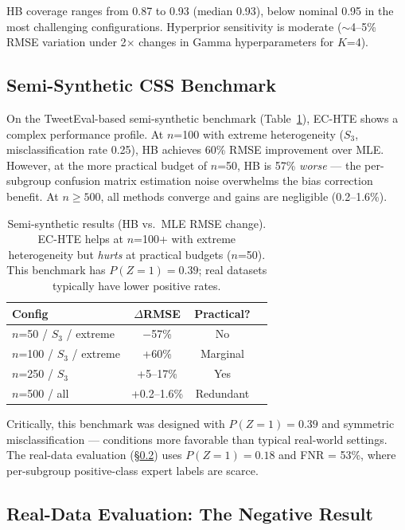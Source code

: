 \documentclass[11pt]{article}
\begin{document}
HB coverage ranges from 0.87 to 0.93 (median 0.93), below nominal 0.95 in the most challenging configurations.
Hyperprior sensitivity is moderate ($\sim$4--5\% RMSE variation under 2$\times$ changes in Gamma hyperparameters for $K$=4).

\subsection{Semi-Synthetic CSS Benchmark}
\label{sec:semi-synthetic}

On the TweetEval-based semi-synthetic benchmark (Table~\ref{tab:semi-synthetic}), EC-HTE shows a complex performance profile.
At $n$=100 with extreme heterogeneity ($S_3$, misclassification rate 0.25), HB achieves 60\% RMSE improvement over MLE.
However, at the more practical budget of $n$=50, HB is 57\% \emph{worse} --- the per-subgroup confusion matrix estimation noise overwhelms the bias correction benefit.
At $n \geq 500$, all methods converge and gains are negligible (0.2--1.6\%).

\begin{table}[t]
\centering
\small
\begin{tabular}{lccc}
\toprule
Config & $\Delta$RMSE & Practical? \\
\midrule
$n$=50 / $S_3$ / extreme & $-$57\% & No \\
$n$=100 / $S_3$ / extreme & +60\% & Marginal \\
$n$=250 / $S_3$ & +5--17\% & Yes \\
$n$=500 / all & +0.2--1.6\% & Redundant \\
\bottomrule
\end{tabular}
\caption{Semi-synthetic results (HB vs.\ MLE RMSE change). EC-HTE helps at $n$=100+ with extreme heterogeneity but \emph{hurts} at practical budgets ($n$=50). This benchmark has $P(Z{=}1) = 0.39$; real datasets typically have lower positive rates.}
\label{tab:semi-synthetic}
\end{table}

Critically, this benchmark was designed with $P(Z{=}1) = 0.39$ and symmetric misclassification --- conditions more favorable than typical real-world settings.
The real-data evaluation (\S\ref{sec:real-data}) uses $P(Z{=}1) = 0.18$ and FNR = 53\%, where per-subgroup positive-class expert labels are scarce.

\subsection{Real-Data Evaluation: The Negative Result}
\label{sec:real-data}
\end{document}
